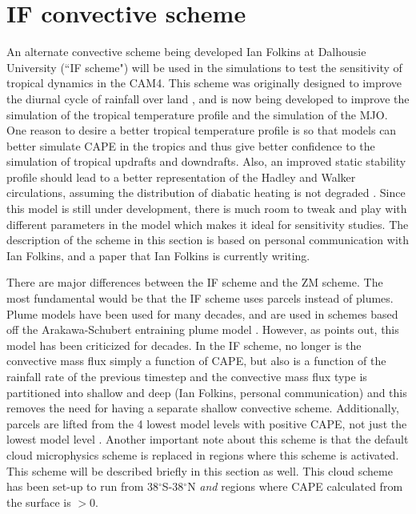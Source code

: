 \documentclass[letterpaper,12pt,titlepage,oneside,final]{book}
\begin{document}
\section{IF convective scheme}
An alternate convective scheme being developed Ian Folkins at Dalhousie University (``IF scheme") will be used in the simulations to test the sensitivity of tropical dynamics in the CAM4. This scheme was originally designed to improve the diurnal cycle of rainfall over land \citep{folkins_simple_2014}, and is now being developed to improve the simulation of the tropical temperature profile and the simulation of the MJO. One reason to desire a better tropical temperature profile is so that models can better simulate CAPE in the tropics and thus give better confidence to the simulation of tropical updrafts and downdrafts. Also, an improved static stability profile should lead to a better representation of the Hadley and Walker circulations, assuming the distribution of diabatic heating is not degraded \citep{sohn_role_2016,mitas_recent_2006}. Since this model is still under development, there is much room to tweak and play with different parameters in the model which makes it ideal for sensitivity studies. The description of the scheme in this section is based on personal communication with Ian Folkins, \cite{folkins_simple_2014} and a paper that Ian Folkins is currently writing.

There are major differences between the IF scheme and the ZM scheme. The most fundamental would be that the IF scheme uses parcels instead of plumes. Plume models have been used for many decades, and are used in schemes based off the Arakawa-Schubert entraining plume model \citep{yano_basic_2014}. However, as \cite{yano_basic_2014} points out, this model has been criticized for decades. In the IF scheme, no longer is the convective mass flux simply a function of CAPE, but also is a function of the rainfall rate of the previous timestep and the convective mass flux type is partitioned into shallow and deep (Ian Folkins, personal communication) and this removes the need for having a separate shallow convective scheme. Additionally, parcels are lifted from the 4 lowest model levels with positive CAPE, not just the lowest model level \citep{folkins_simple_2014}. Another important note about this scheme is that the default cloud microphysics scheme is replaced in regions where this scheme is activated. This scheme will be described briefly in this section as well. This cloud scheme has been set-up to run from 38$^{\circ}$S-38$^{\circ}$N \textit{and} regions where CAPE calculated from the surface is $>0$.
\end{document}
